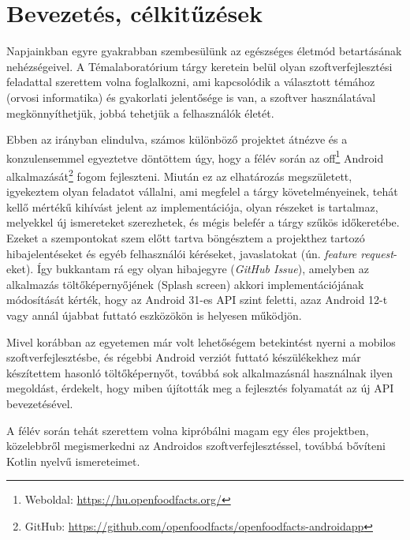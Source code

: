 \chapter{Bevezetés, célkitűzések}
Napjainkban egyre gyakrabban szembesülünk az egészséges életmód betartásának nehézségeivel.
A Témalaboratórium tárgy keretein belül olyan szoftverfejlesztési feladattal szerettem volna
foglalkozni, ami kapcsolódik a választott témához (orvosi informatika) és gyakorlati
jelentősége is van, a szoftver használatával megkönnyíthetjük, jobbá tehetjük a felhasználók életét.

Ebben az irányban elindulva, számos különböző projektet átnézve és a konzulensemmel egyeztetve
döntöttem úgy, hogy a félév során az \acrlong{off}\footnote{Weboldal: \url{https://hu.openfoodfacts.org/}}
Android alkalmazását\footnote{GitHub: \url{https://github.com/openfoodfacts/openfoodfacts-androidapp}} fogom fejleszteni.
Miután ez az elhatározás megszületett, igyekeztem olyan feladatot vállalni,
ami megfelel a tárgy követelményeinek, tehát kellő mértékű kihívást jelent
az implementációja, olyan részeket is tartalmaz, melyekkel új ismereteket szerezhetek, és mégis
belefér a tárgy szűkös időkeretébe. Ezeket a szempontokat szem előtt tartva böngésztem a
projekthez tartozó hibajelentéseket és egyéb felhasználói kéréseket, javaslatokat (ún. \textit{feature request}-eket).
Így bukkantam rá egy olyan hibajegyre (\textit{GitHub Issue}), amelyben az alkalmazás
töltőképernyőjének (Splash screen) akkori implementációjának módosítását kérték, hogy
az Android 31-es API szint feletti, azaz Android 12-t vagy annál újabbat futtató eszközökön
is helyesen működjön.

Mivel korábban az egyetemen már volt lehetőségem betekintést nyerni a mobilos szoftverfejlesztésbe,
és régebbi Android verziót futtató készülékekhez már készítettem hasonló töltőképernyőt, továbbá
sok alkalmazásnál használnak ilyen megoldást, érdekelt, hogy miben újították meg a fejlesztés
folyamatát az új API bevezetésével.

A félév során tehát szerettem volna kipróbálni magam egy éles projektben, közelebbről megismerkedni
az Androidos szoftverfejlesztéssel, továbbá bővíteni Kotlin nyelvű ismereteimet.
